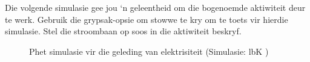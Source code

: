 \label{m38706*eip-316}Die volgende simulasie gee jou ‘n geleentheid om die bogenoemde aktiwiteit deur te werk. Gebruik die grypsak-opsie om stowwe te kry om te toets vir hierdie simulasie. Stel die stroombaan op soos in die aktiwiteit beskryf.
    \setcounter{subfigure}{0}
	\begin{figure}[H] %
    \textnormal{Phet simulasie vir die geleding van elektrisiteit}\vspace{.1in} \nopagebreak
  \label{m38806*phet!!!underscore!!!sim}\label{m38806*phet-simulation}
             { (Simulasie:  lbK )}
      \vspace{2pt}
    \vspace{.1in}
 \end{figure}    
        \par 
    \label{m38706*cid7}
